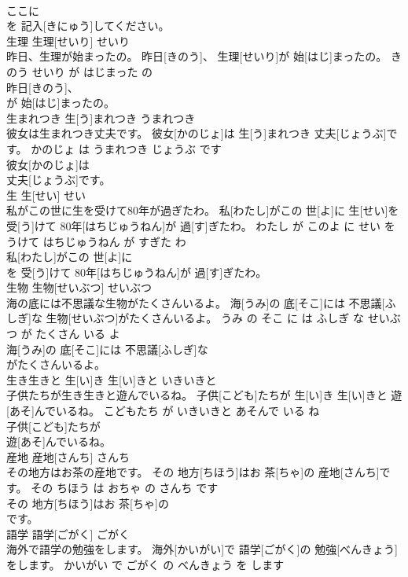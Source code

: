 \documentclass[8pt]{extreport}
\begin{document}
\begin{CJK}{UTF8}{min}
\\	ここに
\\	を 記入[きにゅう]してください。			
\\	生理	生理[せいり]	せいり	
\\	昨日、生理が始まったの。	昨日[きのう]、 生理[せいり]が 始[はじ]まったの。	きのう せいり が はじまった の	
\\	昨日[きのう]、
\\	が 始[はじ]まったの。			
\\	生まれつき	生[う]まれつき	うまれつき	
\\	彼女は生まれつき丈夫です。	彼女[かのじょ]は 生[う]まれつき 丈夫[じょうぶ]です。	かのじょ は うまれつき じょうぶ です	
\\	彼女[かのじょ]は
\\	丈夫[じょうぶ]です。			
\\	生	生[せい]	せい	
\\	私がこの世に生を受けて80年が過ぎたわ。	私[わたし]がこの 世[よ]に 生[せい]を 受[う]けて 80年[はちじゅうねん]が 過[す]ぎたわ。	わたし が このよ に せい を うけて はちじゅうねん が すぎた わ	
\\	私[わたし]がこの 世[よ]に
\\	を 受[う]けて 80年[はちじゅうねん]が 過[す]ぎたわ。			
\\	生物	生物[せいぶつ]	せいぶつ	
\\	海の底には不思議な生物がたくさんいるよ。	海[うみ]の 底[そこ]には 不思議[ふしぎ]な 生物[せいぶつ]がたくさんいるよ。	うみ の そこ に は ふしぎ な せいぶつ が たくさん いる よ	
\\	海[うみ]の 底[そこ]には 不思議[ふしぎ]な
\\	がたくさんいるよ。			
\\	生き生きと	生[い]き 生[い]きと	いきいきと	
\\	子供たちが生き生きと遊んでいるね。	子供[こども]たちが 生[い]き 生[い]きと 遊[あそ]んでいるね。	こどもたち が いきいきと あそんで いる ね	
\\	子供[こども]たちが
\\	遊[あそ]んでいるね。			
\\	産地	産地[さんち]	さんち	
\\	その地方はお茶の産地です。	その 地方[ちほう]はお 茶[ちゃ]の 産地[さんち]です。	その ちほう は おちゃ の さんち です	
\\	その 地方[ちほう]はお 茶[ちゃ]の
\\	です。			
\\	語学	語学[ごがく]	ごがく	
\\	海外で語学の勉強をします。	海外[かいがい]で 語学[ごがく]の 勉強[べんきょう]をします。	かいがい で ごがく の べんきょう を します	

\end{CJK}
\end{document}

